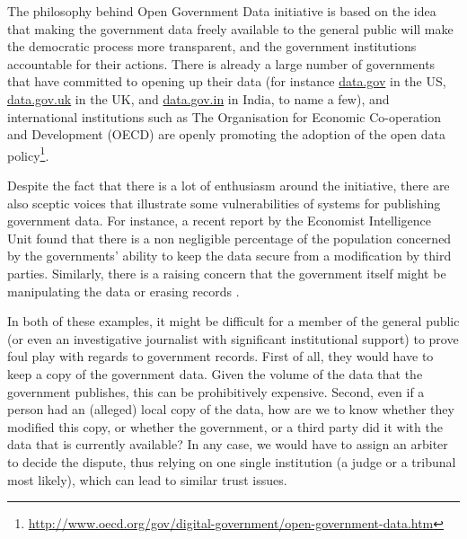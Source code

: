 The philosophy behind Open Government Data initiative is based on the idea that making the government data freely available to the general public will make the democratic process more transparent, and the government institutions accountable for their actions. There is already a large number of governments that have committed to opening up their data (for instance \url{data.gov} in the US, \url{data.gov.uk} in the UK, and \url{data.gov.in} in India, to name a few), and international institutions such as The Organisation for Economic Co-operation and Development (OECD) are openly promoting the adoption of the open data policy\footnote{\url{http://www.oecd.org/gov/digital-government/open-government-data.htm}}.

Despite the fact that there is a lot of enthusiasm around the initiative, there are also sceptic voices that illustrate some vulnerabilities of  systems for publishing government data. For instance, a recent report by the Economist Intelligence Unit \cite{economist} found that there is a non negligible percentage of the population concerned by the governments' ability to keep the data secure from a modification by third parties. Similarly, there is a raising concern that the government itself might be manipulating the data or erasing records \cite{poynter}. 

In both of these examples, it might be difficult for a member of the general public (or even an investigative journalist with significant institutional support) to prove foul play with regards to government records. First of all, they would have to keep a copy of the government data. Given the volume of the data that the government publishes, this can be prohibitively expensive. Second, even if a person had an (alleged) local copy of the data, how are we to know whether they modified this  copy, or whether the government, or a third party did it with the data that is currently available? In any case, we would have to assign an arbiter to decide the dispute, thus relying on one single institution (a judge or a tribunal most likely), which can lead to similar trust issues.




